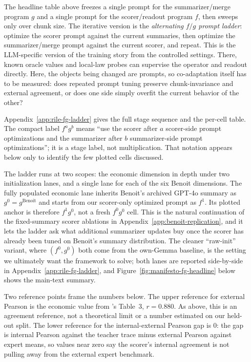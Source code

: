 The headline table above freezes a single prompt for the summarizer/merge
program $g$ and a single prompt for the scorer/readout program $f$, then
sweeps only over chunk size. The iterative version is the
\emph{alternating $f/g$ prompt ladder}: optimize the scorer prompt against
the current summaries, then optimize the summarizer/merge prompt against
the current scorer, and repeat. This is the LLM-specific version of the
training story from the controlled settings. There, known oracle values
and local-law probes can supervise the operator and readout directly.
Here, the objects being changed are prompts, so co-adaptation itself has
to be measured: does repeated prompt tuning preserve chunk-invariance and
external agreement, or does one side simply overfit the current behavior
of the other?

Appendix~\ref{app:rile-fg-ladder} gives the full stage sequence and the
per-cell table. The compact label $f^a g^b$ means ``use the scorer after
$a$ scorer-side prompt optimizations and the summarizer after $b$
summarizer-side prompt optimizations''; it is a stage label, not
multiplication. That notation appears below only to identify the few
plotted cells discussed.

The ladder runs at two scopes: the economic dimension in depth under
two initialization lanes, and a single lane for each of the six
Benoit dimensions. The fully populated economic lane inherits
Benoit's archived GPT-4o summary as $g^0 = g^{\mathrm{Benoit}}$ and
starts from our scorer-only optimized prompt as $f^1$. Its plotted anchor is therefore
$f^1 g^0$, not a fresh $f^0 g^0$ cell. This is the natural continuation
of the fixed-summary scorer ablations in Appendix~\ref{app:benoit-replication},
and it lets the ladder ask what additional summarizer updates buy once
the scorer has already been tuned on Benoit's summary distribution. The
cleaner ``raw-init'' variant, where $(f^0, g^0)$ both come from the
own-Gemma baseline, is the setting we ultimately want the framework to
solve; both lanes are reported side-by-side in
Appendix~\ref{app:rile-fg-ladder}, and
Figure~\ref{fig:manifesto-fg-headline} below shows the main-text summary.

Two reference points frame the numbers below. The upper reference for
external Pearson is the economic value from \citet{BenoitEtAl2025}'s
Table~3, $r = 0.880$. As above, this is an agreement reference, not a
theoretical limit or a number estimated on our held-out split. The
lower reference for the
internal-external Pearson gap is $0$: the gap is internal Pearson
against the teacher trace minus external Pearson against expert means,
so values near zero say the scorer's internal agreement is not pulling
away from the external expert benchmark.

